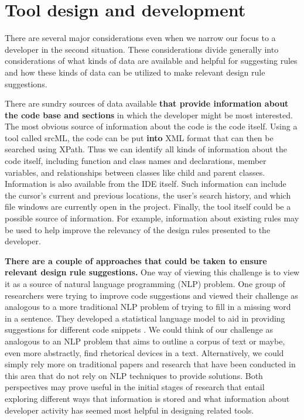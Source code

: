 \documentclass[12pt]{article}
\begin{document}
\section{Tool design and development}
There are several major considerations even when we narrow our focus to a developer in the second situation. These considerations divide generally into considerations of what kinds of data are available and helpful for suggesting rules and how these kinds of data can be utilized to make relevant design rule suggestions.

There are sundry sources of data available \textbf{that provide information about the code base and sections} in which the developer might be most interested. The most obvious source of information about the code is the code itself. Using a tool called srcML, the code can be put \textbf{into} XML format that can then be searched using XPath. Thus we can identify all kinds of information about the code itself, including function and class names and declarations, member variables, and relationships between classes like child and parent classes. Information is also available from the IDE itself. Such information can include the cursor's current and previous locations, the user's search history, and which file windows are currently open in the project. Finally, the tool itself could be a possible source of information. For example, information about existing rules may be used to help improve the relevancy of the design rules presented to the developer.

\textbf{There are a couple of approaches that could be taken to ensure relevant design rule suggestions.} One way of viewing this challenge is to view it as a source of natural language programming (NLP) problem. One group of researchers were trying to improve code suggestions and viewed their challenge as analogous to a more traditional NLP problem of trying to fill in a missing word in a sentence. They developed a statistical language model to aid in providing suggestions for different code snippets \cite{RaychevEtAl2014}. We could think of our challenge as analogous to an NLP problem that aims to outline a corpus of text or maybe, even more abstractly, find rhetorical devices in a text. Alternatively, we could simply rely more on traditional papers and research that have been conducted in this area that do not rely on NLP techniques to provide solutions. Both perspectives may prove useful in the initial stages of research that entail exploring different ways that information is stored and what information about developer activity has seemed most helpful in designing related tools.
\end{document}
